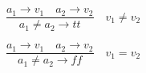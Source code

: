 \documentclass[12pt]{article}
\begin{document}
\section{}

\section{}
\subsection{}
\begin{equation}
   [neq-tt] \quad \frac{a_1 \rightarrow v_1 \quad a_2 \rightarrow v_2}{a_1 \neq a_2 \rightarrow tt} \quad v_1 \neq v_2
\end{equation}

\begin{equation}
   [neq-ff] \quad \frac{a_1 \rightarrow v_1 \quad a_2 \rightarrow v_2}{a_1 \neq a_2 \rightarrow ff} \quad v_1 = v_2
\end{equation}
\end{document}
